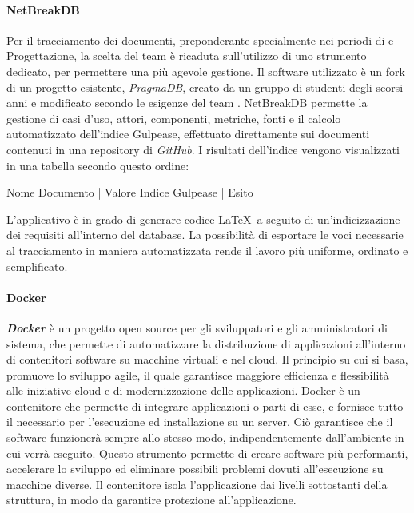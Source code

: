 		\paragraph{NetBreakDB}
		Per il tracciamento dei documenti, preponderante specialmente nei periodi di \AdR e Progettazione, la scelta del team è ricaduta sull'utilizzo di uno strumento dedicato, per permettere una più agevole gestione. Il software utilizzato è un fork di un progetto esistente, \textit{PragmaDB}, creato da un gruppo di studenti degli scorsi anni e modificato secondo le esigenze del team \textit{\gruppo}. NetBreakDB permette la gestione di casi d'uso, attori, componenti, metriche, fonti e il calcolo automatizzato dell'indice Gulpease, effettuato direttamente sui documenti contenuti in una repository di \textit{GitHub}. I risultati dell'indice vengono visualizzati in una tabella secondo questo ordine:
		\begin{center}
			Nome Documento | Valore Indice Gulpease | Esito
		\end{center}
		L'applicativo è in grado di generare codice \LaTeX\ a seguito di un'indicizzazione dei requisiti all'interno del database. La possibilità di esportare le voci necessarie al tracciamento in maniera automatizzata rende il lavoro più uniforme, ordinato e semplificato.
		
		\paragraph{Docker}
		\textbf{\textit{Docker}} è un progetto open source per gli sviluppatori e gli amministratori di sistema, che permette di automatizzare la distribuzione di applicazioni all'interno di contenitori software su macchine virtuali e nel cloud. Il principio su cui si basa, promuove lo sviluppo agile, il quale garantisce maggiore efficienza e flessibilità alle iniziative cloud e di modernizzazione delle applicazioni. Docker è un contenitore che permette di integrare applicazioni o parti di esse, e fornisce tutto il necessario per l'esecuzione ed installazione su un server. Ciò garantisce che il software funzionerà sempre allo stesso modo, indipendentemente dall'ambiente in cui verrà eseguito. Questo strumento permette di creare software più performanti, accelerare lo sviluppo ed eliminare possibili problemi dovuti all'esecuzione su macchine diverse. Il contenitore isola l'applicazione dai livelli sottostanti della struttura, in modo da garantire protezione all'applicazione. 
			
